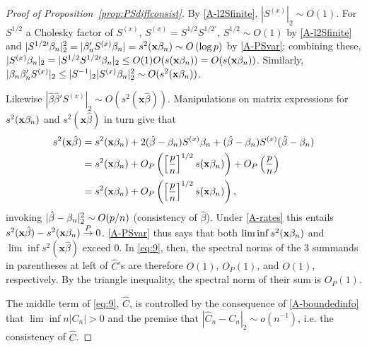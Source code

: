 \documentclass{article}
\theoremstyle{remark}
\begin{document}
\begin{proof}[Proof of Proposition~\ref{prop:PSdiffconsist}]
By \ref{A-l2Sfinite}, $|S^{(x)}|_{2} \sim O(1)$.  For $S^{1/2}$ a Cholesky factor of $S^{(x)}$, $S^{(x)} = S^{1/2}S^{1/2\prime}$, $S^{1/2} \sim O(1)$ by \ref{A-l2Sfinite} and $|S^{{1/2}\prime}\beta_{n } |_{2}^{2} = |\beta_{n }'S^{(x)}\beta_{n }| = s^{2}(\mathbf{x}\beta_{n }) \sim O\left( \log p\right)
$ by \ref{A-PSvar}; combining these, $|S^{(x)}\betatrue|_{2} = |S^{1/2}S^{{1/2}\prime}\betatrue|_{2} \leq O(1) O(s(\mathbf{x}\betatrue)) = O(s(\mathbf{x}\betatrue))  %
$.  Similarly, $|\beta_{n }\beta_{n }'S^{(x)}|_{2}  \leq |S^{-1}|_{2} |S^{(x)}\beta_{n }|_{2}^{2} \sim O(s^{2}(\mathbf{x}\beta_{n }))$. 

Likewise $|\hat{\beta}\hat{\beta}'S^{(x)}|_{2} \sim O(s^{2}(\mathbf{x}\hat\beta))$.  Manipulations on matrix expressions for $s^2(\mathbf{x}\beta_{n })$ and $s^2(\mathbf{x}\hat\beta)$ in turn give that 
\begin{align}
  s^{2}(\mathbf{x}\hat\beta) &= s^{2}(\mathbf{x}\beta_{n }) + 2(\hat\beta - \beta_{n })S^{(x)}\beta_{n } + (\hat\beta - \beta_{n })S^{(x)}(\hat\beta -\beta_{n }) \nonumber \\
  &= s^{2}(\mathbf{x}\beta_{n }) + O_{P}\left(\left[\frac{p }{n}\right]^{1/2}s(\mathbf{x}\beta_{n })\right) + O_{P}\left(  \frac{p}{n} \right) \nonumber \\
& = s^{2}(\mathbf{x}\beta_{n }) + O_{P}\left(\left[\frac{p}{n}\right]^{1/2}s(\mathbf{x}\beta_{n })\right)  ,\label{eq:11}
\end{align}
invoking  $|\hat\beta - \beta_{n }|_{2}^{2} \sim O(p/n)$ (consistency of $\hat\beta$).
Under \ref{A-rates} this entails $ s^{2}(\mathbf{x}\hat\beta) -  s^{2}(\mathbf{x}\beta_{n }) \stackrel{P}{\rightarrow} 0$.  \ref{A-PSvar} thus says that both  $\lim\inf s^{2}(\mathbf{x}\beta_{n })$ and $\lim\inf s^{2}(\mathbf{x}\hat\beta)$ exceed 0. 
In \eqref{eq:9}, then, the spectral norms of the 3 summands in parentheses at left of $\hat{C}$'s are therefore $O(1)$, $O_{P}(1)$, and $O(1)$, respectively. By the triangle inequality, the spectral norm of their sum is $O_{P}(1)$.

The middle term of \eqref{eq:9}, $\hat C$, is controlled by the consequence of \ref{A-boundedinfo} that $\lim\inf n|C_{n}|>0$ and the premise that $|\hat{C}_{n} - C_{n}|_{2} \sim o(n^{-1})$, i.e. the consistency of $\hat{C}$.  


\end{proof}
\end{document}
